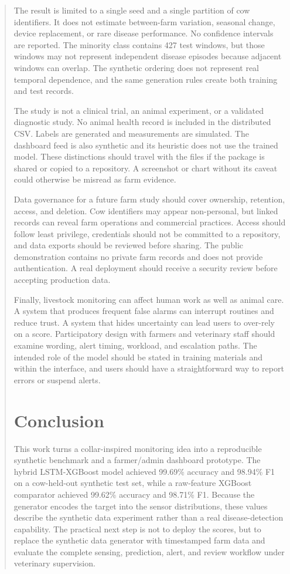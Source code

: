 \documentclass[journal]{IEEEtran}
\begin{document}
\begin{abstract}
The result is limited to a single seed and a single partition of cow identifiers. It does not estimate between-farm variation, seasonal change, device replacement, or rare disease performance. No confidence intervals are reported. The minority class contains 427 test windows, but those windows may not represent independent disease episodes because adjacent windows can overlap. The synthetic ordering does not represent real temporal dependence, and the same generation rules create both training and test records.

The study is not a clinical trial, an animal experiment, or a validated diagnostic study. No animal health record is included in the distributed CSV. Labels are generated and measurements are simulated. The dashboard feed is also synthetic and its heuristic does not use the trained model. These distinctions should travel with the files if the package is shared or copied to a repository. A screenshot or chart without its caveat could otherwise be misread as farm evidence.

Data governance for a future farm study should cover ownership, retention, access, and deletion. Cow identifiers may appear non-personal, but linked records can reveal farm operations and commercial practices. Access should follow least privilege, credentials should not be committed to a repository, and data exports should be reviewed before sharing. The public demonstration contains no private farm records and does not provide authentication. A real deployment should receive a security review before accepting production data.

Finally, livestock monitoring can affect human work as well as animal care. A system that produces frequent false alarms can interrupt routines and reduce trust. A system that hides uncertainty can lead users to over-rely on a score. Participatory design with farmers and veterinary staff should examine wording, alert timing, workload, and escalation paths. The intended role of the model should be stated in training materials and within the interface, and users should have a straightforward way to report errors or suspend alerts.

\section{Conclusion}

This work turns a collar-inspired monitoring idea into a reproducible synthetic benchmark and a farmer/admin dashboard prototype. The hybrid LSTM-XGBoost model achieved 99.69\% accuracy and 98.94\% F1 on a cow-held-out synthetic test set, while a raw-feature XGBoost comparator achieved 99.62\% accuracy and 98.71\% F1. Because the generator encodes the target into the sensor distributions, these values describe the synthetic data experiment rather than a real disease-detection capability. The practical next step is not to deploy the scores, but to replace the synthetic data generator with timestamped farm data and evaluate the complete sensing, prediction, alert, and review workflow under veterinary supervision.


\end{abstract}
\end{document}
